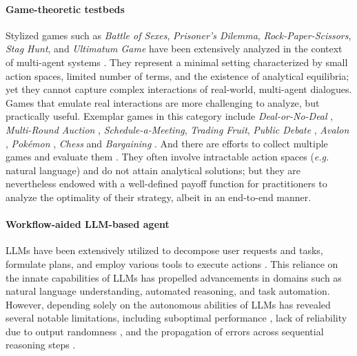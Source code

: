 % 

\paragraph{Game-theoretic testbeds} Stylized games such as \textit{Battle of Sexes}, \textit{Prisoner's Dilemma}, \textit{Rock-Paper-Scissors}, \textit{Stag Hunt}, and \textit{Ultimatum Game} have been extensively analyzed in the context of multi-agent systems \citep{sreedhar2024simulating,akata2023playing,fan2024can,lore2023strategic}. They represent a minimal setting characterized by small action spaces, limited number of terms, and the existence of analytical equilibria; yet they cannot capture complex interactions of real-world, multi-agent dialogues. Games that emulate real interactions are more challenging to analyze, but practically useful. Exemplar games in this category include \textit{Deal-or-No-Deal} \citep{lewis2017deal}, \textit{Multi-Round Auction} \citep{mao2023alympics}, \textit{Schedule-a-Meeting}, \textit{Trading Fruit}, \textit{Public Debate} \citep{gemp2024states}, \textit{Avalon} \citep{wang2023avalon}, \textit{Pokémon} \citep{hu2024pok}, \textit{Chess} \citep{guo2024can} and \textit{Bargaining} \citep{xia2024measuring}. And there are efforts to collect multiple games and evaluate them \citep{duan2024gtbench}. They often involve intractable action spaces (\textit{e.g.} natural language) and do not attain analytical solutions; but they are nevertheless endowed with a well-defined payoff function for practitioners to analyze the optimality of their strategy, albeit in an end-to-end manner. 

\paragraph{Workflow-aided LLM-based agent}
LLMs have been extensively utilized to decompose user requests and tasks, formulate plans, and employ various tools to execute actions \cite{ge2023openagi, wu2023autogen, li2023camel, langc, topsakal2023creating, xi2023rise}. This reliance on the innate capabilities of LLMs has propelled advancements in domains such as natural language understanding, automated reasoning, and task automation. However, depending solely on the autonomous abilities of LLMs has revealed several notable limitations, including suboptimal performance \cite{xie2024travelplanner, xia2024agentless}, lack of reliability due to output randomness \cite{inglecomprehensive, li2024survey, schwartz2023enhancing}, and the propagation of errors across sequential reasoning steps \cite{yu2023thought}.

